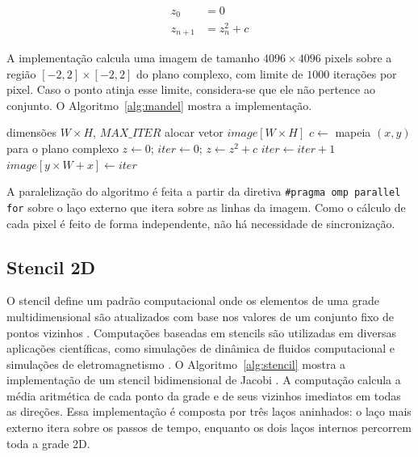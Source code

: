 \documentclass[12pt, letterpaper]{article}
\begin{document}
\begin{equation}
	\label{eq:mandelbrot}
	\begin{aligned}
		z_0     & = 0         \\
		z_{n+1} & = z_n^2 + c
	\end{aligned}
\end{equation}


A implementação calcula uma imagem de tamanho $4096 \times 4096$ pixels sobre a região $[-2, 2] \times [-2, 2]$ do plano complexo, com limite de $1000$ iterações por pixel. Caso o ponto atinja esse limite, considera-se que ele não pertence ao conjunto. O Algoritmo~\ref{alg:mandel} mostra a implementação.

\begin{algorithm}[H]
	\caption{Cálculo do conjunto de Mandelbrot}\label{alg:mandel}
	\begin{algorithmic}[1]
		\Require dimensões $W \times H$, $MAX\_ITER$
		\State alocar vetor $image[W \times H]$
		\State $c \gets$ mapeia $(x, y)$ para o plano complexo
		\State $z \gets 0$;
		\State $iter \gets 0$;
		\State $z \gets z^2 + c$
		\State $iter \gets iter + 1$
		\EndWhile
		\State $image[y \times W + x] \gets iter$
		\EndFor
		\EndFor
	\end{algorithmic}
\end{algorithm}


A paralelização do algoritmo é feita a partir da diretiva \texttt{\#pragma omp parallel for} sobre o laço externo que itera sobre as linhas da imagem. Como o cálculo de cada pixel é feito de forma independente, não há necessidade de sincronização.


\subsection{Stencil 2D}

O stencil define um padrão computacional onde os elementos de uma grade multidimensional são atualizados com base nos valores de um conjunto fixo de pontos vizinhos \cite{Denzler2021}. Computações baseadas em stencils são utilizadas em diversas aplicações científicas, como simulações de dinâmica de fluidos computacional e simulações de eletromagnetismo \cite{TAFLOVE1988547}. O Algoritmo~\ref{alg:stencil} mostra a implementação de um stencil bidimensional de Jacobi \cite{demmel1997applied}. A computação calcula a média aritmética de cada ponto da grade e de seus vizinhos imediatos em todas as direções. Essa implementação é composta por três laços aninhados: o laço mais externo itera sobre os passos de tempo, enquanto os dois laços internos percorrem toda a grade 2D.
\end{document}

